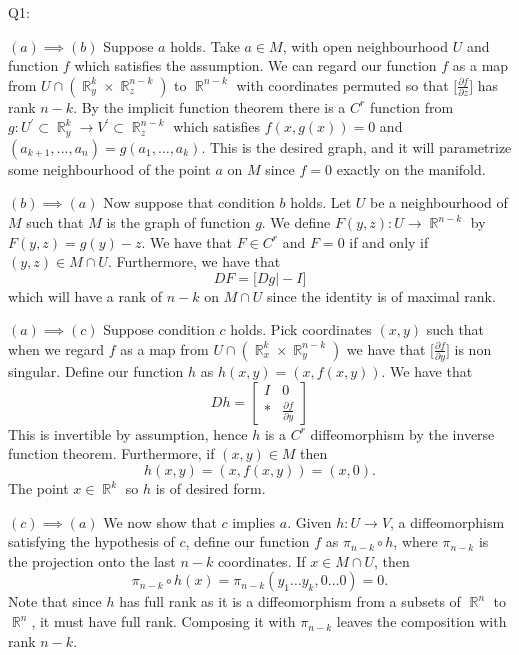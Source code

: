 \documentclass[letterpaper]{article}
\DeclareMathOperator{\R}{\mathbb{R}}
\begin{document}
 \noindent Q1:
\begin{description}
\item{$(a) \implies (b)$} \newline  Suppose $a$ holds. Take $a\in M$, with open neighbourhood $U$ and function $f$ which satisfies the assumption. We can regard our function $f$ as a map from $U\cap (\R_y^{k} \times \R_z^{n-k})$ to $\R^{n-k}$ with coordinates permuted so that $ \Big[ \frac{\partial f}{\partial z} \Big]$ has rank $n-k$. 
By the implicit function theorem there is a $C^r$ function from $g: U^\prime \subset \R_y^{k} \to V^\prime \subset \R_z^{n-k}$ which satisfies $f(x,g(x)) = 0$ and $(a_{k+1}, \dots, a_n) = g(a_{1} , \dots , a_{k} )$. This is the desired graph, and it will parametrize some neighbourhood of the point $a$ on $M$ since $f=0$ exactly on the manifold. 
\item{$(b) \implies (a)$} \newline  
Now suppose that condition $b$ holds. Let $U$ be a neighbourhood of $M$ such that $M$ is the graph of function $g$. We define $F(y,z): U \to \R^{n-k}$ by $F(y,z) =g(y) -z$. We have that $F\in C^r$ and $F=0$ if and only if $(y,z)\in M\cap U$. Furthermore, we have that $$DF = \Big[ Dg \Big| -I \Big]$$ which will have a rank of $n-k$ on $M\cap U$ since the identity is of maximal rank.
\item{$(a) \implies (c)$} \newline 
Suppose condition $c$ holds. Pick coordinates $(x,y)$ such that when we regard $f$ as a map from $U\cap (\R_x^k \times \R_y^{n-k})$ we have that $\Big[ \frac{\partial f}{\partial y} \Big]$ is non singular. Define our function $h$ as $h(x,y) = (x,f(x,y)).$ We have that $$Dh = \begin{bmatrix}
    I & 0 \\ * & \frac{\partial f}{\partial y}
\end{bmatrix}$$
This is invertible by assumption, hence $h$ is a $C^r$ diffeomorphism by the inverse function theorem. Furthermore, if $(x,y)\in M$ then $$h(x,y) = (x,f(x,y)) = (x,0).$$ The point $x\in \R^k$ so $h$ is of desired form. 
\item{$(c)\implies (a)$} \newline
We now show that $c$ implies $a$. Given $h: U \to V$, a diffeomorphism satisfying the hypothesis of $c$, define our function $f$ as $\pi_{n-k}\circ h$, where $\pi_{n-k}$ is the projection onto the last $n-k$ coordinates. If $x\in M\cap U$, then $$\pi_{n-k}\circ h(x) = \pi_{n-k} (y_1\dots y_k, 0 \dots 0) =0.$$ Note that since $h$ has full rank as it is a diffeomorphism from a subsets of $\R^n$ to $\R^n$, it must have full rank. Composing it with $\pi_{n-k}$ leaves the composition with rank $n-k$. 

\end{description}
\end{document}
